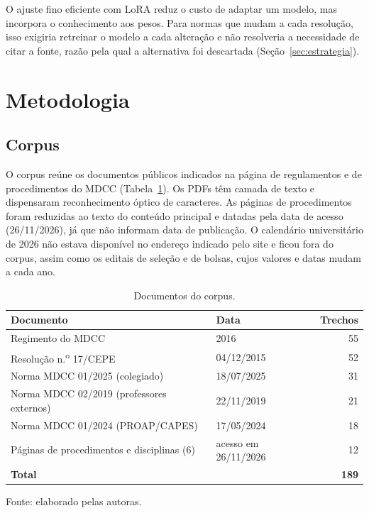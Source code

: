 \documentclass{sbc-template}
\begin{document}
O ajuste fino eficiente com LoRA \cite{Hu2021} reduz o custo de adaptar um modelo,
mas incorpora o conhecimento aos pesos. Para normas que mudam a cada resolução, isso
exigiria retreinar o modelo a cada alteração e não resolveria a necessidade de citar
a fonte, razão pela qual a alternativa foi descartada (Seção~\ref{sec:estrategia}).

\section{Metodologia}
\label{sec:metodologia}

\subsection{Corpus}
\label{sec:corpus}

O corpus reúne os documentos públicos indicados na página de regulamentos e de
procedimentos do MDCC (Tabela~\ref{tab:corpus}). Os PDFs têm camada de texto e
dispensaram reconhecimento óptico de caracteres. As páginas de procedimentos foram
reduzidas ao texto do conteúdo principal e datadas pela data de acesso
(26/11/2026), já que não informam data de publicação. O calendário universitário de
2026 não estava disponível no endereço indicado pelo site e ficou fora do corpus, assim
como os editais de seleção e de bolsas, cujos valores e datas mudam a cada ano.

\begin{table}[ht]
\centering
\caption{Documentos do corpus.}
\label{tab:corpus}
\footnotesize
\begin{tabular}{llr}
\toprule
\textbf{Documento} & \textbf{Data} & \textbf{Trechos} \\
\midrule
Regimento do MDCC & 2016 & 55 \\
Resolução n.\textsuperscript{o} 17/CEPE & 04/12/2015 & 52 \\
Norma MDCC 01/2025 (colegiado) & 18/07/2025 & 31 \\
Norma MDCC 02/2019 (professores externos) & 22/11/2019 & 21 \\
Norma MDCC 01/2024 (PROAP/CAPES) & 17/05/2024 & 18 \\
Páginas de procedimentos e disciplinas (6) & acesso em 26/11/2026 & 12 \\
\midrule
\textbf{Total} & & \textbf{189} \\
\bottomrule
\end{tabular}

\vspace{2pt}
{\footnotesize Fonte: elaborado pelas autoras.}
\end{table}
\end{document}
